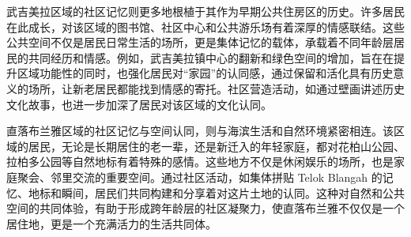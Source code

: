 \documentclass[11pt,a4paper,twoside,openany]{book}
\begin{document}
武吉美拉区域的社区记忆则更多地根植于其作为早期公共住房区的历史。许多居民在此成长，对该区域的图书馆、社区中心和公共游乐场有着深厚的情感联结。这些公共空间不仅是居民日常生活的场所，更是集体记忆的载体，承载着不同年龄层居民的共同经历和情感。例如，武吉美拉镇中心的翻新和绿色空间的增加，旨在在提升区域功能性的同时，也强化居民对“家园”的认同感，通过保留和活化具有历史意义的场所，让新老居民都能找到情感的寄托。社区营造活动，如通过壁画讲述历史文化故事，也进一步加深了居民对该区域的文化认同。

直落布兰雅区域的社区记忆与空间认同，则与海滨生活和自然环境紧密相连。该区域的居民，无论是长期居住的老一辈，还是新迁入的年轻家庭，都对花柏山公园、拉柏多公园等自然地标有着特殊的感情。这些地方不仅是休闲娱乐的场所，也是家庭聚会、邻里交流的重要空间。通过社区活动，如集体拼贴 Telok Blangah 的记忆、地标和瞬间，居民们共同构建和分享着对这片土地的认同。这种对自然和公共空间的共同体验，有助于形成跨年龄层的社区凝聚力，使直落布兰雅不仅仅是一个居住地，更是一个充满活力的生活共同体。
\end{document}
